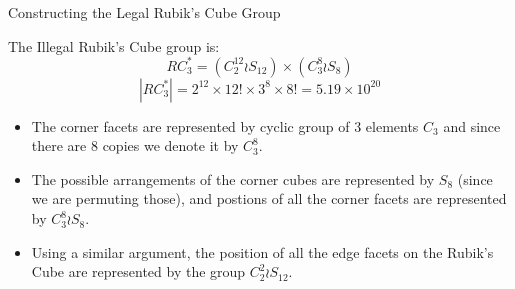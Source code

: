 \documentclass[final]{beamer}
\newlength{\colwidth}
\begin{document}
\begin{frame}[t]
\begin{columns}[t]
\begin{column}{\colwidth}


  \begin{block}{Constructing the Legal Rubik's Cube Group}
    


    
    The Illegal Rubik's Cube group is:
    $$RC^{*}_{3} = (C^{12}_2 \wr S_{12}) \times (C^8_3 \wr S_8)$$
    $$|RC^{*}_{3}| = 2^{12} \times 12! \times 3^8 \times 8! = 5.19 \times 10^{20}$$
    
\begin{itemize} 
\item The corner facets are represented by cyclic group of 3 elements $C_{3}$ and since there are $8$ copies we denote it by $C_3 ^8$.
\item The possible arrangements of the corner cubes are represented by $S_{8}$ (since we are permuting those), and postions of all the corner facets are represented by $C_{3}^{8} \wr S_{8}$.
\item Using a similar argument, the position of all the edge facets on the Rubik's Cube are represented by the group $C_{2}^{2} \wr S_{12}$.
\end{itemize} 


\end{block}
\end{column}
\end{columns}
\end{frame}
\end{document}
